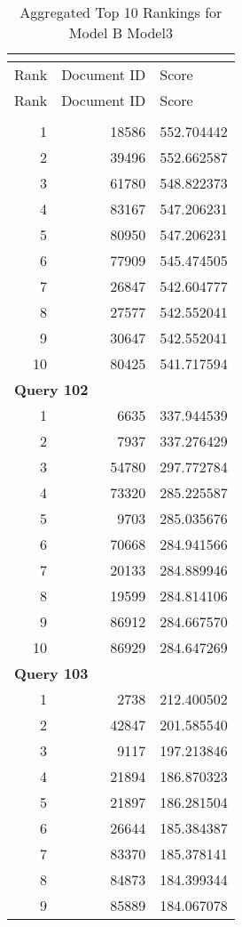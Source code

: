 \begin{longtable}[{p}]{@{}rrp{}@{}}
\caption{Aggregated Top 10 Rankings for Model B Model3} {\label{tab:aggregated_BModel3}}\\
\toprule
Rank & Document ID & Score \\
\midrule
\endfirsthead
\toprule
Rank & Document ID & Score \\
\midrule
\endhead
\endfoot
\bottomrule
\endlastfoot
\multicolumn{3}{l}{\bfseries Query 101} \\
1 & 18586 & 552.704442 \\
2 & 39496 & 552.662587 \\
3 & 61780 & 548.822373 \\
4 & 83167 & 547.206231 \\
5 & 80950 & 547.206231 \\
6 & 77909 & 545.474505 \\
7 & 26847 & 542.604777 \\
8 & 27577 & 542.552041 \\
9 & 30647 & 542.552041 \\
10 & 80425 & 541.717594 \\
\midrule
\multicolumn{3}{l}{\bfseries Query 102} \\
1 & 6635 & 337.944539 \\
2 & 7937 & 337.276429 \\
3 & 54780 & 297.772784 \\
4 & 73320 & 285.225587 \\
5 & 9703 & 285.035676 \\
6 & 70668 & 284.941566 \\
7 & 20133 & 284.889946 \\
8 & 19599 & 284.814106 \\
9 & 86912 & 284.667570 \\
10 & 86929 & 284.647269 \\
\midrule
\multicolumn{3}{l}{\bfseries Query 103} \\
1 & 2738 & 212.400502 \\
2 & 42847 & 201.585540 \\
3 & 9117 & 197.213846 \\
4 & 21894 & 186.870323 \\
5 & 21897 & 186.281504 \\
6 & 26644 & 185.384387 \\
7 & 83370 & 185.378141 \\
8 & 84873 & 184.399344 \\
9 & 85889 & 184.067078 \\

\end{longtable}
